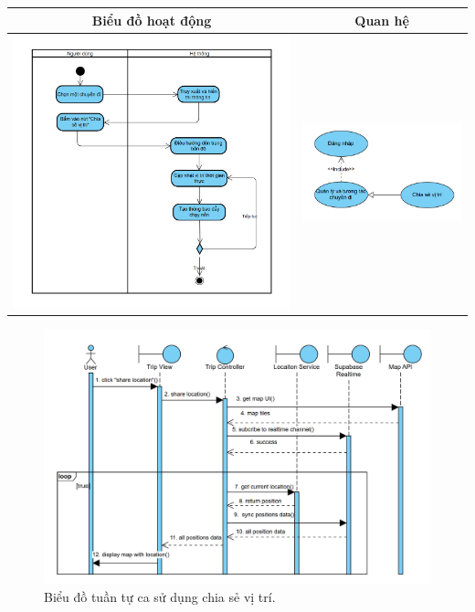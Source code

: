 \noindent 
\begin{tabular}{| c | c |}
    \hline
    \textbf{Biểu đồ hoạt động} & \textbf{Quan hệ} \\ 
    \hline
    \includegraphics[width=0.5\linewidth]{figures/c3/3-3-16-ad.png} 
    & 
    \includegraphics[width=0.45\linewidth]{figures/c3/3-3-16-rd.png} \\ 
    \hline
\end{tabular}

\vspace{0.8cm}

\begin{figure}[H]
    \centering  
    \includegraphics[width=1\textwidth]{figures/c3/3-3-16-sd.png}
    \caption{Biểu đồ tuần tự ca sử dụng chia sẻ vị trí.}
    \label{fig:3-3-16-sequence-diagram}
\end{figure}